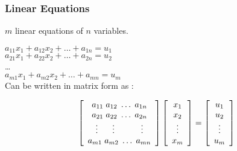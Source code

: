   \begin{frame}[fragile]\frametitle{Linear Equations}
$m$ linear equations of $n$ variables.

$a_{11} x_1 + a_{12}x_2 + \ldots + a_{1n} = u_1$\\
$a_{21} x_1 + a_{22}x_2 + \ldots + a_{2n} = u_2$\\
\ldots \\
$a_{m1} x_1 + a_{m2}x_2 + \ldots + a_{mn} = u_m$ \\

Can be written in matrix form as :

$$ \left[ \begin{array}{ccc} a_{11} \hspace{1mm} a_{12} \hspace{1mm}
                                    \ldots \hspace{1mm} a_{1n} \\
                              a_{21} \hspace{1mm} a_{22} \hspace{1mm} 
                                     \ldots \hspace{1mm} a_{2n} \\
                              \vdots \hspace{6mm} \vdots \hspace{11mm} \vdots \\
                              a_{m1} \hspace{1mm} a_{m2} \hspace{1mm}
                                     \ldots \hspace{1mm} a_{mn}
              \end{array}  \right]   \left[ \begin{array}{c} x_{1} \\ x_2 \\ \vdots \\ x_m               \end{array}  \right] 
                =  \left[ \begin{array}{c} u_{1} \\ u_2 \\ \vdots \\ u_m               \end{array}  \right]                $$
\end{frame}


